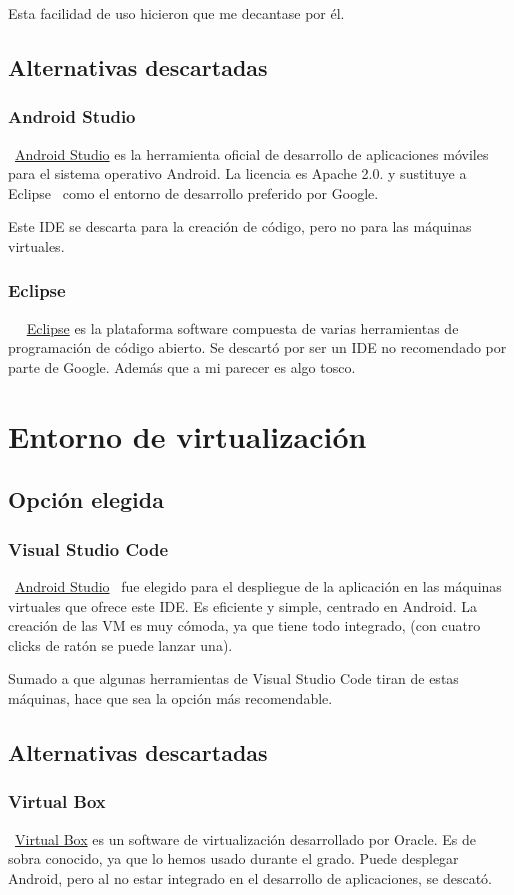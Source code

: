Esta facilidad de uso hicieron que me decantase por él.

\subsection{Alternativas descartadas}

\subsubsection{Android Studio}\label{androidstudio}
~\href{https://developer.android.com/studio}{Android Studio} es la herramienta oficial de desarrollo de aplicaciones móviles para el sistema operativo Android. La licencia es Apache 2.0. y sustituye a Eclipse~\pageref{eclipse} como el entorno de desarrollo preferido por Google.

Este IDE se descarta para la creación de código, pero no para las máquinas virtuales.

\subsubsection{Eclipse}~\label{eclipse}
~\href{https://www.eclipse.org/}{Eclipse} es la plataforma software compuesta de varias herramientas de programación de código abierto. Se descartó por ser un IDE no recomendado por parte de Google. Además que a mi parecer es algo tosco.

\section{Entorno de virtualización}

\subsection{Opción elegida}

\subsubsection{Visual Studio Code}
~\href{https://developer.android.com/studio}{Android Studio}~\pageref{androidstudio} fue elegido para el despliegue de la aplicación en las máquinas virtuales que ofrece este IDE. Es eficiente y simple, centrado en Android. La creación de las VM es muy cómoda, ya que tiene todo integrado, (con cuatro clicks de ratón se puede lanzar una).

Sumado a que algunas herramientas de Visual Studio Code tiran de estas máquinas, hace que sea la opción más recomendable.

\subsection{Alternativas descartadas}

\subsubsection{Virtual Box}
~\href{https://www.virtualbox.org/}{Virtual Box} es un software de virtualización desarrollado por Oracle. Es de sobra conocido, ya que lo hemos usado durante el grado. Puede desplegar Android, pero al no estar integrado en el desarrollo de aplicaciones, se descató.